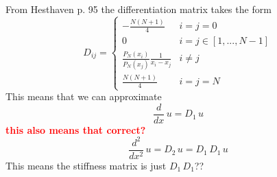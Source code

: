 \documentclass[12pt]{article}%
\begin{document}
From Hesthaven p. 95 the differentiation matrix takes the form
\begin{equation}
D_{ij}=\begin{cases}
-\frac{N(N+1)}{4} &i=j=0\\
0& i=j\in [1,...,N-1]\\
\frac{P_N(x_i)}{P_N(x_j)}\frac{1}{x_i-x_j} & i\neq j\\
\frac{N(N+1)}{4} & i=j=N
\end{cases}
\end{equation}
This means that we can approximate 
\begin{equation}
\frac{d}{dx}\,u = D_1 \,u
\end{equation}
\textcolor{red}{\textbf{this also means that correct?}}
\begin{equation}
\frac{d^2}{dx^2}\,u = D_2 \,u=D_1\,D_1 \,u
\end{equation}
This means the stiffness matrix is just $D_1\,D_1$??
\end{document}
